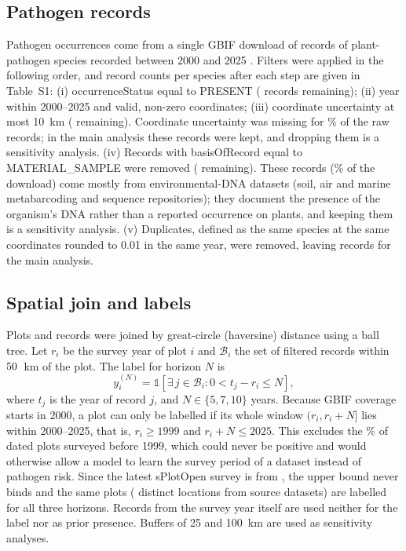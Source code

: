 \documentclass[a4paper,fleqn]{cas-sc}
\begin{document}
\subsection{Pathogen records}

Pathogen occurrences come from a single GBIF download of \gbifRecordsRaw{} records of \gbifSpecies{} plant-pathogen species recorded between 2000 and 2025 \citep{gbifdownload}. Filters were applied in the following order, and record counts per species after each step are given in Table~S1: (i) occurrenceStatus equal to PRESENT (\gbifPresent{} records remaining); (ii) year within 2000--2025 and valid, non-zero coordinates; (iii) coordinate uncertainty at most 10~km (\gbifUncOK{} remaining). Coordinate uncertainty was missing for \pctUncMissing\% of the raw records; in the main analysis these records were kept, and dropping them is a sensitivity analysis. (iv) Records with basisOfRecord equal to MATERIAL\_SAMPLE were removed (\gbifNoMS{} remaining). These \nMaterialSample{} records (\pctMaterialSample\% of the download) come mostly from environmental-DNA datasets (soil, air and marine metabarcoding and sequence repositories); they document the presence of the organism's DNA rather than a reported occurrence on plants, and keeping them is a sensitivity analysis. (v) Duplicates, defined as the same species at the same coordinates rounded to 0.01\textdegree{} in the same year, were removed, leaving \gbifFinal{} records for the main analysis.

\subsection{Spatial join and labels}

Plots and records were joined by great-circle (haversine) distance using a ball tree. Let $r_i$ be the survey year of plot $i$ and $\mathcal{B}_i$ the set of filtered records within $50$~km of the plot. The label for horizon $N$ is
\begin{equation}
y_i^{(N)} = \mathbb{1}\left[\exists\, j \in \mathcal{B}_i : 0 < t_j - r_i \leq N\right],
\label{eq:label}
\end{equation}
where $t_j$ is the year of record $j$, and $N \in \{5, 7, 10\}$ years. Because GBIF coverage starts in 2000, a plot can only be labelled if its whole window $(r_i, r_i+N]$ lies within 2000--2025, that is, $r_i \geq 1999$ and $r_i + N \leq 2025$. This excludes the \pctPlotsPreNineteen\% of dated plots surveyed before 1999, which could never be positive and would otherwise allow a model to learn the survey period of a dataset instead of pathogen risk. Since the latest sPlotOpen survey is from \surveyYearMax, the upper bound never binds and the same \nEligible{} plots (\nEligibleCoords{} distinct locations from \nEligibleDatasets{} source datasets) are labelled for all three horizons. Records from the survey year itself are used neither for the label nor as prior presence. Buffers of 25 and 100~km are used as sensitivity analyses.
\end{document}
